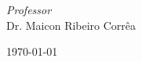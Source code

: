 \begin{titlepage}
	
	
	\vfill\vfill\vfill %
		\begin{flushright}
			\large
			\textit{Professor}\\
			Dr. Maicon Ribeiro Corrêa %
		\end{flushright}
	
	{\large\today} %
	
	 
	
	\vfill %
	
\end{titlepage}
